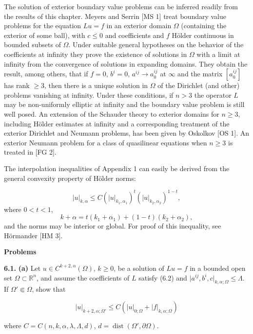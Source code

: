 The solution of exterior boundary value problems can be inferred readily from
the results of this chapter. Meyers and Serrin [MS 1] treat boundary value problems
for the equation $Lu=f$ in an exterior domain $\Omega$ (containing the exterior of some
ball), with $c\leq 0$ and coefficients and $f$ Hölder continuous in bounded subsets of $\Omega$.
Under suitable general hypotheses on the behavior of the coefficients at infinity they
prove the existence of solutions in $\Omega$ with a limit at infinity from the convergence of
solutions in expanding domains. They obtain the result, among others, that if $f=0$,
$b^i=0$, $a^{ij}\to a_0^{ij}$ at $\infty$ and the matrix $[a_0^{ij}]$ has rank $\geq 3$, then there is a unique
solution in $\Omega$ of the Dirichlet (and other) problems vanishing at infinity. Under
these conditions, if $n>3$ the operator $L$ may be non-uniformly elliptic at infinity
and the boundary value problem is still well posed. An extension of the Schauder
theory to exterior domains for $n\geq 3$, including Hölder estimates at infinity and a
corresponding treatment of the exterior Dirichlet and Neumann problems, has
been given by Oskolkov [OS 1]. An exterior Neumann problem for a class of
quasilinear equations when $n\geq 3$ is treated in [FG 2].

\medskip

The interpolation inequalities of Appendix 1 can easily be derived from the
general convexity property of Hölder norms:

\[
\lvert u \rvert_{k,\alpha} \leq C(\lvert u \rvert_{k_1,\alpha_1})^t (\lvert u \rvert_{k_2,\alpha_2})^{1-t},
\]
where $0<t<1$,
\[
k+\alpha = t(k_1+\alpha_1)+(1-t)(k_2+\alpha_2),
\]
and the norms may be interior or global. For proof of this inequality, see Hörmander
[HM 3].

\bigskip

\noindent \textbf{Problems}

\medskip

\noindent \textbf{6.1.} \textbf{(a)} Let $u\in C^{k+2,\alpha}(\Omega)$, $k\geq 0$, be a solution of $Lu=f$ in a bounded open set
$\Omega\subset \mathbb{R}^n$, and assume the coefficients of $L$ satisfy (6.2) and $\lvert a^{ij}, b^i, c\rvert_{k,\alpha;\Omega}\leq \Lambda$. If
$\Omega' \Subset \Omega$, show that

\[
\lvert u\rvert_{k+2,\alpha;\Omega'} \leq C(\lvert u\rvert_{0;\Omega}+\lvert f\rvert_{k,\alpha;\Omega})
\]

\noindent where $C = C(n,k,\alpha,\lambda,\Lambda,d)$, $d = \operatorname{dist}(\Omega',\partial\Omega)$.


